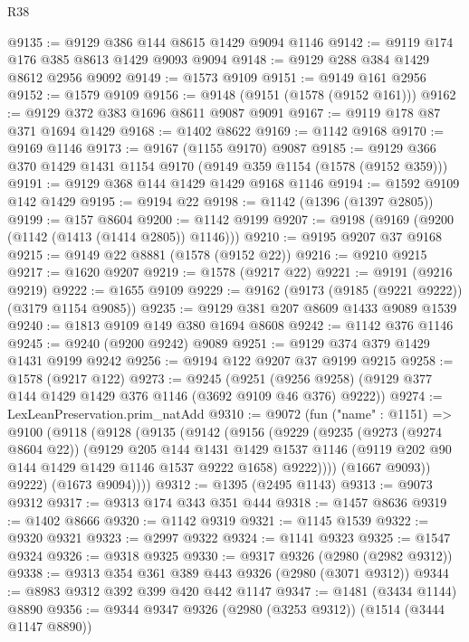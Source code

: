 \begin{lexlean}{R38}
\begin{coremodule}
@9135 := @9129 @386 @144 @8615 @1429 @9094 @1146
@9142 := @9119 @174 @176 @385 @8613 @1429 @9093 @9094
@9148 := @9129 @288 @384 @1429 @8612 @2956 @9092
@9149 := @1573 @9109
@9151 := @9149 @161 @2956
@9152 := @1579 @9109
@9156 := @9148 (@9151 (@1578 (@9152 @161)))
@9162 := @9129 @372 @383 @1696 @8611 @9087 @9091
@9167 := @9119 @178 @87 @371 @1694 @1429
@9168 := @1402 @8622
@9169 := @1142 @9168
@9170 := @9169 @1146
@9173 := @9167 (@1155 @9170) @9087
@9185 := @9129 @366 @370 @1429 @1431 @1154 @9170 (@9149 @359 @1154 (@1578 (@9152 @359)))
@9191 := @9129 @368 @144 @1429 @1429 @9168 @1146
@9194 := @1592 @9109 @142 @1429
@9195 := @9194 @22
@9198 := @1142 (@1396 (@1397 @2805))
@9199 := @157 @8604
@9200 := @1142 @9199
@9207 := @9198 (@9169 (@9200 (@1142 (@1413 (@1414 @2805)) @1146)))
@9210 := @9195 @9207 @37 @9168
@9215 := @9149 @22 @8881 (@1578 (@9152 @22))
@9216 := @9210 @9215
@9217 := @1620 @9207
@9219 := @1578 (@9217 @22)
@9221 := @9191 (@9216 @9219)
@9222 := @1655 @9109
@9229 := @9162 (@9173 (@9185 (@9221 @9222)) (@3179 @1154 @9085))
@9235 := @9129 @381 @207 @8609 @1433 @9089 @1539
@9240 := @1813 @9109 @149 @380 @1694 @8608
@9242 := @1142 @376 @1146
@9245 := @9240 (@9200 @9242) @9089
@9251 := @9129 @374 @379 @1429 @1431 @9199 @9242
@9256 := @9194 @122 @9207 @37 @9199 @9215
@9258 := @1578 (@9217 @122)
@9273 := @9245
    (@9251 (@9256 @9258) (@9129 @377 @144 @1429 @1429 @376 @1146 (@3692 @9109 @46 @376) @9222))
@9274 := LexLeanPreservation.prim_natAdd
@9310 := @9072
    (fun ("name" : @1151) =>
    @9100
      (@9118
        (@9128
          (@9135
            (@9142
              (@9156
                (@9229
                  (@9235
                    (@9273 (@9274 @8604 @22))
                    (@9129
                      @205
                      @144
                      @1431
                      @1429
                      @1537
                      @1146
                      (@9119 @202 @90 @144 @1429 @1429 @1146 @1537 @9222 @1658)
                      @9222))))
              (@1667 @9093))
            @9222)
          (@1673 @9094))))
@9312 := @1395 (@2495 @1143)
@9313 := @9073 @9312
@9317 := @9313 @174 @343 @351 @444
@9318 := @1457 @8636
@9319 := @1402 @8666
@9320 := @1142 @9319
@9321 := @1145 @1539
@9322 := @9320 @9321
@9323 := @2997 @9322
@9324 := @1141 @9323
@9325 := @1547 @9324
@9326 := @9318 @9325
@9330 := @9317 @9326 (@2980 (@2982 @9312))
@9338 := @9313 @354 @361 @389 @443 @9326 (@2980 (@3071 @9312))
@9344 := @8983 @9312 @392 @399 @420 @442 @1147
@9347 := @1481 (@3434 @1144) @8890
@9356 := @9344 @9347 @9326 (@2980 (@3253 @9312)) (@1514 (@3444 @1147 @8890))

\end{coremodule}
\end{lexlean}

